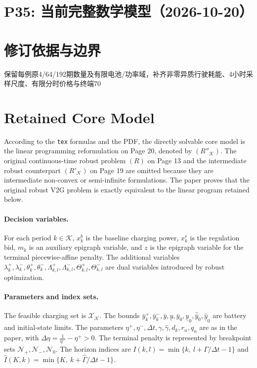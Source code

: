 \documentclass[11pt]{ctexart}
\begin{document}
\section*{P35: 当前完整数学模型（2026-10-20）}
\section*{修订依据与边界}保留每例原4/64/192期数量及有限电池/功率域，补齐非零异质行驶耗能、4小时采样尺度、有限分时价格与终端70%




\section*{Retained Core Model}
According to the \texttt{tex} formulas and the PDF, the directly solvable core model is the
linear programming reformulation on Page 20, denoted by $(R''_{\mathcal K})$. The original
continuous-time robust problem $(R)$ on Page 13 and the intermediate robust counterpart
$(R'_{\mathcal K})$ on Page 19 are omitted because they are intermediate non-convex or
semi-infinite formulations. The paper proves that the original robust V2G problem is exactly
equivalent to the linear program retained below.

\paragraph{Decision variables.}
For each period $k \in \mathcal{K}$, $x_k^b$ is the baseline charging power, $x_k^r$ is the
regulation bid, $m_k$ is an auxiliary epigraph variable, and $z$ is the epigraph variable for
the terminal piecewise-affine penalty. The additional variables
$\lambda_k^+,\lambda_k^-,\theta_k^+,\theta_k^-,\Lambda_{k,l}^+,\Lambda_{k,l}^-,
\Theta_{k,l}^+,\Theta_{k,l}^-$ are dual variables introduced by robust optimization.

\paragraph{Parameters and index sets.}
The feasible charging set is $\mathcal{X}_{\mathcal K}$. The bounds
$\bar y_k^+,\bar y_k^-,\bar y,\underline y,\bar y_0,\underline y_0,
\hat{\bar y}_0,\hat{\underline y}_0$ are battery and initial-state limits.
The parameters $\eta^+,\eta^-,\Delta t,\gamma,\hat{\gamma},d_k,r_n,q_n$ are as in the paper,
with $\Delta\eta = \frac{1}{\eta^-} - \eta^+ > 0$.
The terminal penalty is represented by breakpoint sets
$\mathcal{N}_+,\mathcal{N}_-,\mathcal{N}_0$.
The horizon indices are
$I(k,l)=\min\{k,\ l+\Gamma/\Delta t-1\}$ and
$\hat I(K,k)=\min\{K,\ k+\hat{\Gamma}/\Delta t-1\}$.
\end{document}
